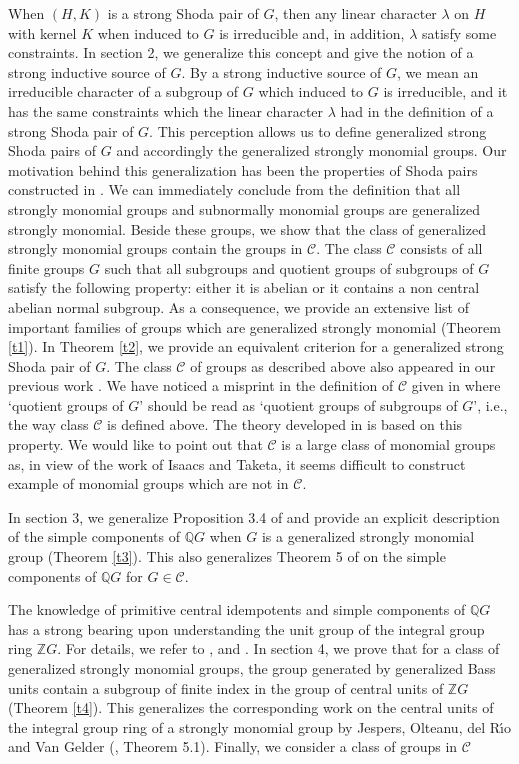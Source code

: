 \documentclass[12pt,a4paper]{article}
\begin{document}
When $(H,K)$ is a strong Shoda pair of $G$, then any linear character $ \lambda $ on $H$ with kernel $K$ when induced to $G$ is irreducible and, in addition, $\lambda$ satisfy some constraints. In section 2, we generalize this concept and give the notion of a strong inductive source of $G$. By a strong inductive source of $G$, we mean an irreducible character of a subgroup of $G$ which induced to $G$ is irreducible, and it has the same constraints which the linear character $\lambda$ had in the definition of a strong Shoda pair of $G$. This perception allows us to define generalized strong Shoda pairs of $G$ and accordingly the generalized strongly monomial groups. Our motivation behind this generalization has been the properties of Shoda pairs constructed in \cite{BK}. We can immediately conclude from the definition  that all strongly monomial groups and subnormally monomial groups are generalized strongly monomial. Beside these groups, we show that the class of generalized strongly monomial groups contain the groups in $\mathcal{C}$. The class $\mathcal{C}$ consists of all finite groups $G$ such that all subgroups and quotient groups of subgroups of $G$ satisfy the following property: either it is abelian or it contains a non central abelian normal subgroup. As a consequence, we provide an extensive list of important families of groups which are generalized strongly monomial (Theorem \ref{t1}). In Theorem \ref{t2}, we provide an equivalent criterion for a generalized strong Shoda pair of $G$. The class $\mathcal{C}$ of groups as described above also appeared in our previous work \cite{BK}. We have noticed a misprint in the definition of $\mathcal{C}$ given in \cite{BK} where `quotient groups of $G$' should be read as `quotient groups of subgroups of $G$', i.e., the way class $\mathcal{C}$ is defined above. The theory developed in \cite{BK} is based on this property. We would like to point out that $\mathcal{C}$ is a large class of monomial groups as, in view of the work of Isaacs\cite{I} and Taketa\cite{T}, it seems difficult to construct example of monomial groups which are not in $\mathcal{C}$. \par In section 3, we generalize Proposition 3.4 of \cite{OdRS04} and provide an explicit description of the simple components of $ \mathbb{Q}G $ when $G$ is a generalized strongly monomial group (Theorem \ref{t3}). This also generalizes Theorem 5 of \cite{BK} on the simple components of $\mathbb{Q}G$ for $G \in \mathcal{C}.$ \par The knowledge of primitive central idempotents and simple components of $\mathbb{Q}G$ has a strong bearing upon understanding the unit group of the integral group ring $\mathbb{Z}G$. For details, we refer to \cite{JdR}, \cite{PS} and \cite{Ss}. In section 4, we prove that for a class of generalized strongly monomial groups, the group generated by generalized Bass units contain a subgroup of finite index in the group of central units of  $ \mathbb{Z}G$ (Theorem \ref{t4}). This generalizes the corresponding work on the central units of the integral group ring of a strongly monomial group by Jespers, Olteanu, del R{\'{\i}}o and Van Gelder (\cite{JOdRVG}, Theorem 5.1). Finally, we consider a class of groups in $\mathcal{C}$ 
\end{document}

